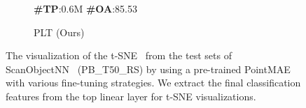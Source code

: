 \begin{figure}
\begin{subfigure}{0.24\textwidth}
        \caption*{\textbf{\#TP}:0.6M \textbf{\#OA}:85.53}
        \caption{PLT (Ours)}
        \label{fig:sub8}
    \end{subfigure}
    \caption{The visualization of the t-SNE~\cite{van2008visualizing} from the test sets of ScanObjectNN~\cite{uy2019revisiting} (PB\_T50\_RS) by using a pre-trained PointMAE~\cite{pang2022masked} with various fine-tuning strategies. We extract the final classification features from the top linear layer for t-SNE visualizations.}
    \label{fig:tsne1}
\end{figure}
